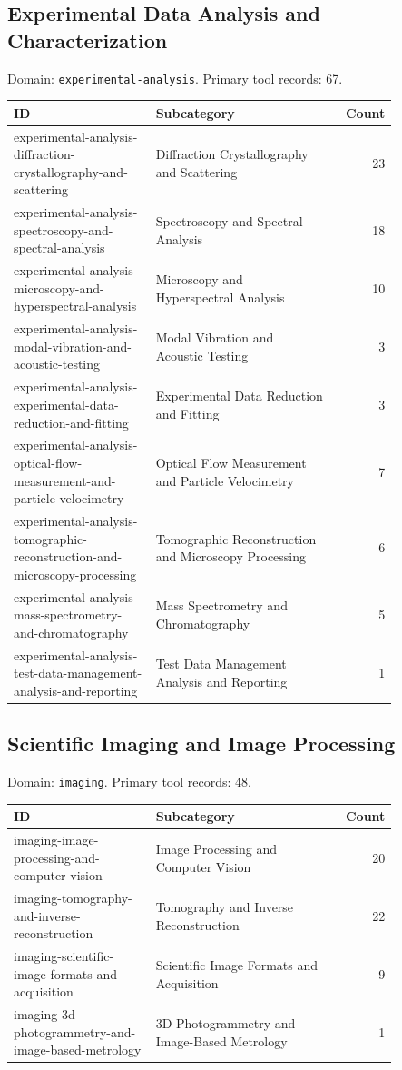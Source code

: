 \subsection{Experimental Data Analysis and Characterization}
\noindent Domain: \texttt{experimental-analysis}. Primary tool records: 67.
\begin{longtable}{p{0.37\linewidth}p{0.47\linewidth}r}
ID & Subcategory & Count\\\hline\endhead
experimental-analysis-diffraction-crystallography-and-scattering & Diffraction Crystallography and Scattering & 23\\
experimental-analysis-spectroscopy-and-spectral-analysis & Spectroscopy and Spectral Analysis & 18\\
experimental-analysis-microscopy-and-hyperspectral-analysis & Microscopy and Hyperspectral Analysis & 10\\
experimental-analysis-modal-vibration-and-acoustic-testing & Modal Vibration and Acoustic Testing & 3\\
experimental-analysis-experimental-data-reduction-and-fitting & Experimental Data Reduction and Fitting & 3\\
experimental-analysis-optical-flow-measurement-and-particle-velocimetry & Optical Flow Measurement and Particle Velocimetry & 7\\
experimental-analysis-tomographic-reconstruction-and-microscopy-processing & Tomographic Reconstruction and Microscopy Processing & 6\\
experimental-analysis-mass-spectrometry-and-chromatography & Mass Spectrometry and Chromatography & 5\\
experimental-analysis-test-data-management-analysis-and-reporting & Test Data Management Analysis and Reporting & 1\\
\end{longtable}
\subsection{Scientific Imaging and Image Processing}
\noindent Domain: \texttt{imaging}. Primary tool records: 48.
\begin{longtable}{p{0.37\linewidth}p{0.47\linewidth}r}
ID & Subcategory & Count\\\hline\endhead
imaging-image-processing-and-computer-vision & Image Processing and Computer Vision & 20\\
imaging-tomography-and-inverse-reconstruction & Tomography and Inverse Reconstruction & 22\\
imaging-scientific-image-formats-and-acquisition & Scientific Image Formats and Acquisition & 9\\
imaging-3d-photogrammetry-and-image-based-metrology & 3D Photogrammetry and Image-Based Metrology & 1\\
\end{longtable}
